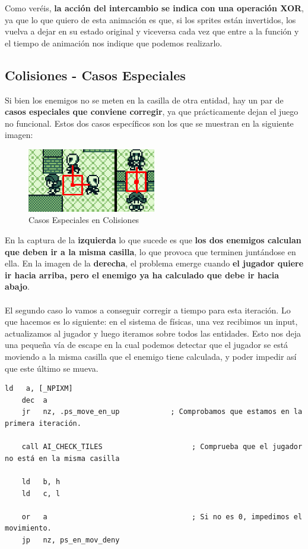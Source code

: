 Como veréis, \textbf{la acción del intercambio se indica con una operación XOR}, ya que lo que quiero de esta animación es que, si los sprites están invertidos, los vuelva a dejar en su estado original y viceversa cada vez que entre a la función y el tiempo de animación nos indique que podemos realizarlo.

\subsection{Colisiones - Casos Especiales}

Si bien los enemigos no se meten en la casilla de otra entidad, hay un par de \textbf{casos especiales que conviene corregir}, ya que prácticamente dejan el juego no funcional. Estos dos casos específicos son los que se muestran en la siguiente imagen:

\begin{figure}[h]
\centering
\includegraphics[width=0.5\textwidth]{include/images/desarrollo/special_cases.png}
\caption{Casos Especiales en Colisiones}
\label{figure:specialcases}
\end{figure}

En la captura de la \textbf{izquierda} lo que sucede es que \textbf{los dos enemigos calculan que deben ir a la misma casilla}, lo que provoca que terminen juntándose en ella. En la imagen de la \textbf{derecha}, el problema emerge cuando \textbf{el jugador quiere ir hacia arriba, pero el enemigo ya ha calculado que debe ir hacia abajo}.
\\ \\
El segundo caso lo vamos a conseguir corregir a tiempo para esta iteración. Lo que hacemos es lo siguiente: en el sistema de físicas, una vez recibimos un input, actualizamos al jugador y luego iteramos sobre todos las entidades. Esto nos deja una pequeña vía de escape en la cual podemos detectar que el jugador se está moviendo a la misma casilla que el enemigo tiene calculada, y poder impedir así que este último se mueva.

\begin{lstlisting}[caption={Comprobar Tiles y Denegar Movimiento}, label={code:checktiles}]
	ld 	 a, [_NPIXM]
	dec  a
	jr	 nz, .ps_move_en_up 		   ; Comprobamos que estamos en la primera iteración.

	call AI_CHECK_TILES 					; Comprueba que el jugador no está en la misma casilla

	ld 	 b, h
	ld 	 c, l

	or 	 a 									; Si no es 0, impedimos el movimiento.
	jp 	 nz, ps_en_mov_deny
\end{lstlisting}

